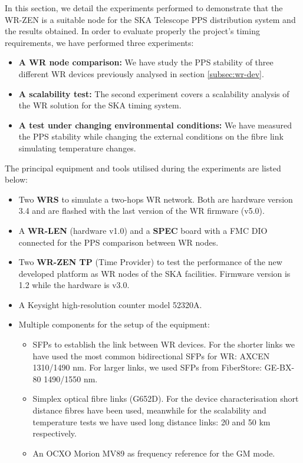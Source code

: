 
In this section, we detail the experiments performed to demonstrate that the WR-ZEN is a suitable node for the SKA Telescope PPS distribution system and the results obtained. 
In order to evaluate properly the project's timing requirements, we have performed three experiments:

\begin{itemize}
	\item \textbf{A WR node comparison:} We have study the PPS stability of three different WR devices 
	previously analysed in section \ref{subsec:wr-dev}.
	\item \textbf{A scalability test:} The second experiment covers a 
	scalability analysis of the WR solution for the SKA timing system.
	\item \textbf{A test under changing environmental conditions:} We have measured 
	the PPS stability while changing the external conditions on the fibre 
	link simulating temperature changes.
\end{itemize}

The principal equipment and tools utilised during the experiments are listed 
below:

\begin{itemize}
    \item Two \textbf{WRS} to simulate a two-hops WR network. Both are 
    hardware version 3.4 and are flashed with the last version of the WR 
    firmware (v5.0).
    
    \item A \textbf{WR-LEN} (hardware v1.0) and a \textbf{SPEC} board with a FMC 
    DIO connected for the PPS comparison between WR nodes.
    
    \item Two \textbf{WR-ZEN TP} (Time Provider) to test the 
    performance of the new developed platform as WR nodes of the SKA 
    facilities. Firmware version is 1.2 while the hardware is v3.0.
    
    \item A Keysight high-resolution counter model 52320A.
    
    \item Multiple components for the setup of the equipment:
    \begin{itemize}
        \item SFPs to establish the link between WR devices. For the shorter links we have used the most common bidirectional SFPs for WR: AXCEN 1310/1490 nm. For larger links, we used SFPs from FiberStore: GE-BX-80 1490/1550 nm.
        \item Simplex optical fibre links (G652D). For the device 
        characterisation short distance fibres have been used, meanwhile for 
        the scalability and temperature tests we have used long distance links: 
        20 and 50 km respectively.
        \item An OCXO Morion MV89 \cite{web:mv89_datasheet} as frequency reference for the GM mode.
    \end{itemize}
    
\end{itemize}

